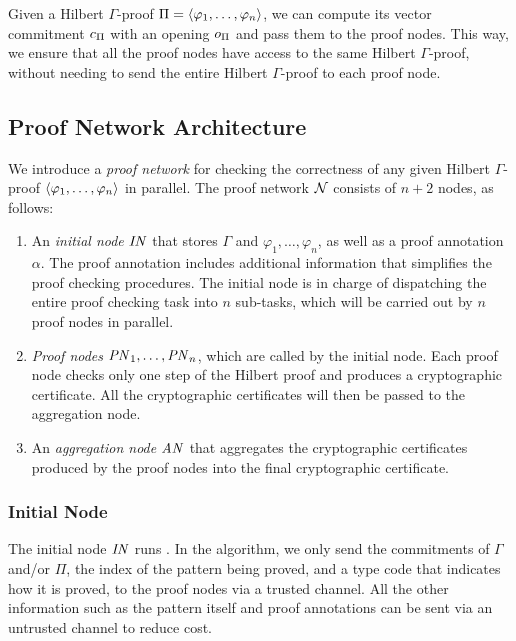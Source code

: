 \documentclass{article}
\begin{document}
Given a Hilbert $\Gamma$-proof $\Pi = \left\langle \varphi_1,\dots,\varphi_n \right\rangle$, we can compute its vector commitment $c_\Pi$ with an opening $o_\Pi$ and pass them to the proof nodes. This way, we ensure that all the proof nodes have access to the same Hilbert $\Gamma$-proof, without needing to send the entire Hilbert $\Gamma$-proof to each proof node.

\subsection{Proof Network Architecture}
\label{sec:proof_network_arc}

We introduce a \emph{proof network} for checking
the correctness of any given Hilbert $\Gamma$-proof
$\left\langle \varphi_1,\dots,\varphi_n \right\rangle$ in parallel.
The proof network $\mathcal{N}$ consists of $n+2$ nodes, as follows:
\begin{enumerate}
\item An \emph{initial node} $\mathit{IN}$ that stores
      $\Gamma$ and $\varphi_1,\dots,\varphi_n$, as well as
      a proof annotation $\alpha$.
      The proof annotation includes additional information that simplifies
      the proof checking procedures.
      The initial node is in charge of dispatching the entire proof checking task into $n$ sub-tasks, which will be carried out by $n$ proof nodes in parallel.
\item \emph{Proof nodes} $\mathit{PN}_{1},\dots,\mathit{PN}_{n}$, which are called by the initial node.
      Each proof node checks only one step of the Hilbert proof
      and produces a cryptographic certificate.
      All the cryptographic certificates will then be       passed to the aggregation node.
\item An \emph{aggregation node} $\mathit{AN}$ that aggregates the cryptographic
      certificates produced by the proof nodes into the final cryptographic certificate.
\end{enumerate}

\subsubsection{Initial Node}
\label{sec:initial_node}

The initial node $\mathit{IN}$ runs .
In the algorithm, we only send the commitments of $\Gamma$ and/or $\Pi$,
the index of the pattern being proved,
and a type code that indicates how it is proved,
to the proof nodes via a trusted channel.
All the other information such as the pattern itself and proof annotations can be sent via an untrusted channel to reduce cost.
\end{document}
